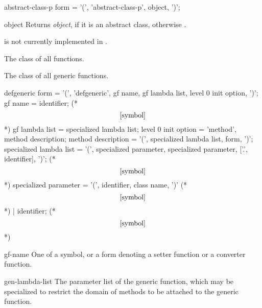 %
%
\savesyntax\abstractClassPSyntax\vbox{\syntax
abstract-class-p form
   = '(', 'abstract-class-p', object, ')';
\endsyntax}
%
\begin{arguments}
    \item[object] Returns {\em object\/}, if it is an abstract class, otherwise
    \nil.
\end{arguments}
%
\begin{note}
     is not currently implemented in \youtoo.
\end{note}
%
\begin{optDefinition}
%
%
The class of all functions.

%
The class of all generic functions.

\label{defgeneric-0}
%
\Syntax
\savesyntax{}\vbox{\syntax
defgeneric form
   = '(', 'defgeneric', gf name, gf lambda list,
     {level 0 init option}, ')';
gf name
   = identifier;     (* \[\ref{symbol}\] *)
gf lambda list
   = specialized lambda list;
level 0 init option
   = 'method', method description;
method description
   = '(', specialized lambda list, {form}, ')';
specialized lambda list
   = '(', specialized parameter,
     {specialized parameter},
     ['.', identifier], ')';     (* \[\ref{symbol}\] *)
specialized parameter
   = '(', identifier, class name, ')'     (* \[\ref{symbol}\] *)
   | identifier;     (* \[\ref{symbol}\] *)
\endsyntax}
\label{defgeneric-syntax-table}
%
\begin{arguments}
    \item[gf-name] One of a symbol, or a form denoting a setter function or a
    converter function.

    \item[gen-lambda-list] The parameter list of the generic function, which may
    be specialized to restrict the domain of methods to be attached to the
    generic function.


\end{arguments}
\end{optDefinition}
